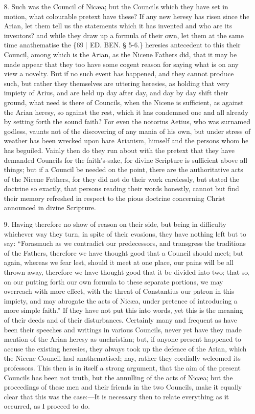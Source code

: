 8. Such was the Council of Nicæa;
but the Councils which they have set in motion, what colourable
pretext have these? If any new heresy has risen since the Arian, let
them tell us the statements which it has invented and who are its
inventors? and while they draw up a formula of their own, let them at
the same time anathematise the \{69 | ED.
BEN. § 5-6.\} heresies antecedent to this their
Council, among which is the Arian, as the Nicene Fathers did, that it
may be made appear that they too have some cogent reason for saying
what is on any view a novelty. But if no such event has happened, and
they cannot produce such, but rather they themselves are uttering
heresies, as holding that very impiety of Arius, and are held up day
after day, and day by day shift their ground, what need is there of
Councils, when the Nicene is sufficient, as against the Arian heresy,
so against the rest, which it has condemned one and all already by
setting forth the sound faith? For even the notorius Aetius, who was
surnamed godless, vaunts not of the discovering of any mania of his
own, but under stress of weather has been wrecked upon bare Arianism,
himself and the persons whom he has beguiled. Vainly then do they run
about with the pretext that they have demanded Councils for the faith's-sake,
for divine Scripture is sufficient above all things; but if a Council
be needed on the point, there are the authoritative acts of the Nicene
Fathers, for they did not do their work carelessly, but stated the
doctrine so exactly, that persons reading their words honestly, cannot
but find their memory refreshed in respect to the pious doctrine
concerning Christ announced in divine Scripture.

9. Having therefore no show of
reason on their side, but being in difficulty whichever way they turn,
in spite of their evasions, they have nothing left but to say: ``Forasmuch
as we contradict our predecessors, and transgress the traditions of
the Fathers, therefore we have thought good that a Council should
meet; but again, whereas we fear lest, should it meet at one place,
our pains will be all thrown away, therefore we have thought good that
it be divided into two; that so, on our putting forth our own formula
to these separate portions, we may overreach with more effect, with
the threat of Constantius our patron in this impiety, and may
abrogate the acts of Nicæa, under pretence of introducing a more
simple faith.'' If they have not put this into words, yet this is the
meaning of their deeds and of their disturbances. Certainly many and
frequent as have been their speeches and writings in various Councils,
never yet have they made mention of the Arian heresy as unchristian;
but, if anyone present happened to accuse the existing heresies, they
always took up the defence of the Arian, which the Nicene Council had
anathematised; nay, rather they cordially welcomed its professors.
This then is in itself a strong argument, that the aim of the present
Councils has been not truth, but the annulling of the acts of Nicæa;
but the proceedings of these men and their friends in the two
Councils, make it equally clear that this was the case:—It is
necessary then to relate everything as it occurred, as I proceed to
do.

